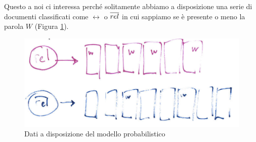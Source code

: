 Questo a noi ci interessa perché solitamente abbiamo a disposizione una serie di documenti classificati come $\rel$ o $\overline{rel}$ in cui sappiamo se è presente o meno la parola $W$ (Figura \ref{fig:data-prob}).

\begin{figure}[htbp]
	\centering
	\includegraphics[width=.5\textwidth]{images/l9-fig-1}
	\caption{Dati a disposizione del modello probabilistico}\label{fig:data-prob}
\end{figure}
